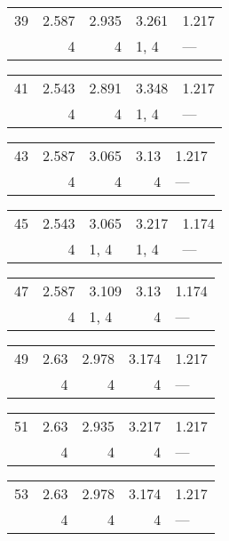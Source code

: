 \begin{tabular}{lrrll}
\toprule
 39 & 2.587 & 2.935 & 3.261 & 1.217 \\
    & 4     & 4     & 1, 4  & ---   \\
\bottomrule
\end{tabular}
\begin{tabular}{lrrll}
\toprule
 41 & 2.543 & 2.891 & 3.348 & 1.217 \\
    & 4     & 4     & 1, 4  & ---   \\
\bottomrule
\end{tabular}
\begin{tabular}{lrrrl}
\toprule
 43 & 2.587 & 3.065 & 3.13 & 1.217 \\
    & 4     & 4     & 4    & ---   \\
\bottomrule
\end{tabular}
\begin{tabular}{lrlll}
\toprule
 45 & 2.543 & 3.065 & 3.217 & 1.174 \\
    & 4     & 1, 4  & 1, 4  & ---   \\
\bottomrule
\end{tabular}
\begin{tabular}{lrlrl}
\toprule
 47 & 2.587 & 3.109 & 3.13 & 1.174 \\
    & 4     & 1, 4  & 4    & ---   \\
\bottomrule
\end{tabular}
\begin{tabular}{lrrrl}
\toprule
 49 & 2.63 & 2.978 & 3.174 & 1.217 \\
    & 4    & 4     & 4     & ---   \\
\bottomrule
\end{tabular}
\begin{tabular}{lrrrl}
\toprule
 51 & 2.63 & 2.935 & 3.217 & 1.217 \\
    & 4    & 4     & 4     & ---   \\
\bottomrule
\end{tabular}
\begin{tabular}{lrrrl}
\toprule
 53 & 2.63 & 2.978 & 3.174 & 1.217 \\
    & 4    & 4     & 4     & ---   \\
\bottomrule
\end{tabular}
